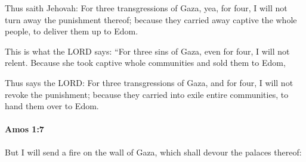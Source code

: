 			\begin{versebox}
					\item[BHS] 
					\item[LXX] 
					\item[ASV] Thus saith Jehovah: For three transgressions of Gaza, yea, for four, I will not turn away the punishment thereof; because they carried away captive the whole people, to deliver them up to Edom.
					\item[NIV] This is what the LORD says: “For three sins of Gaza, even for four, I will not relent. Because she took captive whole communities and sold them to Edom,
					\item[NRSV] Thus says the LORD: For three transgressions of Gaza, and for four, I will not revoke the punishment; because they carried into exile entire communities, to hand them over to Edom.
			\end{versebox}

		\paragraph{Amos 1:7} %
			\label{AMOS-1-7}

			But I will send a fire on the wall of Gaza, which shall devour the palaces thereof:

